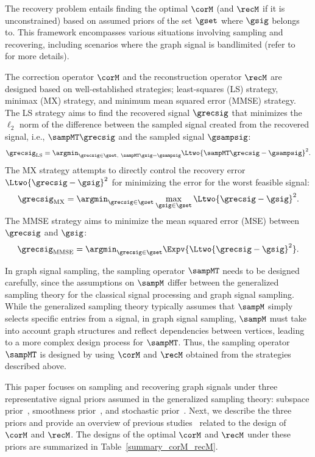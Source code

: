 \documentclass[journal]{IEEEtran}
\begin{document}
The recovery problem entails finding the optimal $\corM$ (and $\recM$ if it is unconstrained) based on assumed priors of the set $\gset$ where $\gsig$ belongs to.
This framework encompasses various situations involving sampling and recovering, including scenarios where the graph signal is bandlimited (refer to~\cite{tanaka2020sampling} for more details).

The correction operator $\corM$ and the reconstruction operator $\recM$ are designed based on well-established strategies; least-squares (LS) strategy, minimax (MX) strategy, and minimum mean squared error (MMSE) strategy.
The LS strategy aims to find the recovered signal $\grecsig$ that minimizes the $\ell_2$ norm of the difference between the sampled signal created from the recovered signal, i.e., $\sampMT \grecsig$ and the sampled signal $\gsampsig$:
\begin{equation} \label{LSstrategy}
\grecsig_{\mathrm{LS}} = \argmin_{\grecsig \in \gset, \ \sampMT \gsig = \gsampsig} \Ltwo{ \sampMT \grecsig - \gsampsig}^{2}.
\end{equation}
The MX strategy attempts to directly control the recovery error $\Ltwo{\grecsig - \gsig}^{2}$ for minimizing the error for the worst feasible signal:
\begin{equation} \label{MXstrategy}
\grecsig_{\mathrm{MX}} = \argmin_{\grecsig \in \gset} \max_{\gsig \in \gset} \Ltwo{ \grecsig - \gsig}^{2}.
\end{equation}
The MMSE strategy aims to minimize the mean squared error (MSE) between $\grecsig$ and $\gsig$:
\begin{equation} \label{MMSEstrategy}
    \grecsig_{\mathrm{MMSE}} = \argmin_{\grecsig \in \gset} \Expv{ \Ltwo{\grecsig - \gsig}^{2}}.
\end{equation}

In graph signal sampling, the sampling operator $\sampMT$ needs to be designed carefully, since the assumptions on $\sampM$ differ between the generalized sampling theory for the classical signal processing and graph signal sampling. 
While the generalized sampling theory typically assumes that $\sampM$ simply selects specific entries from a signal, in graph signal sampling, $\sampM$ must take into account graph structures and reflect dependencies between vertices, leading to a more complex design process for $\sampMT$.
Thus, the sampling operator $\sampMT$ is designed by using $\corM$ and $\recM$ obtained from the strategies described above.

This paper focuses on sampling and recovering graph signals under three representative signal priors assumed in the generalized sampling theory: subspace prior~\cite{tanaka2020sampling}, smoothness prior~\cite{tanaka2020sampling}, and stochastic prior~\cite{hara2023graph}. 
Next, we describe the three priors and provide an overview of previous studies~\cite{tanaka2020gensamp,hara2023graph} related to the design of $\corM$ and $\recM$. 
The designs of the optimal $\corM$ and $\recM$ under these priors are summarized in Table~\ref{summary_corM_recM}. 
\end{document}
